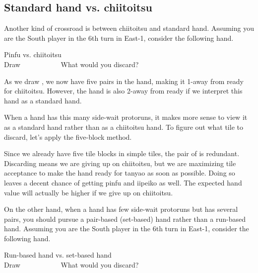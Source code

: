\newpage
\subsection{Standard hand vs. {\jap chiitoitsu}}
Another kind of crossroad is between {\jap chiitoitsu} and standard hand. Assuming you are the South player in the 6th turn in East-1, consider the following hand. 
\bigskip
\begin{itembox}[r]{{\jap Pinfu} vs. {\jap chiitoitsu}}
\bp
{}\bei\bei~\\
\hfill\footnotesize{Draw~~~~~~~~~~~}
\ep
\vspace{-17pt}What would you discard? \vspace{-5pt}
\end{itembox}

\bigskip
\noindent As we draw {\LARGE{}}, we now have five pairs in the hand, making it 1-away from ready for {\jap chiitoitsu}. However, the hand is also 2-away from ready if we interpret this hand as a standard hand. 

\bigskip
When a hand has this many side-wait protoruns, it makes more sense to view it as a standard hand rather than as a {\jap chiitoitsu} hand. To figure out what tile to discard, let's apply the five-block method. 

\emj
Since we already have five tile blocks in simple tiles, the pair of {\LARGE\bei} is redundant. Discarding {\LARGE\bei} means we are giving up on {\jap chiitoitsu}, but we are maximizing tile acceptance to make the hand ready for {\jap tanyao} as soon as possible. Doing so leaves a decent chance of getting {\jap pinfu} and {\jap iipeiko} as well. The expected hand value will actually be higher if we give up on {\jap chiitoitsu}.

\bigskip
On the other hand, when a hand has few side-wait protoruns but has several pairs, you should pursue a pair-based (set-based) hand rather than a run-based hand. Assuming you are the South player in the 6th turn in East-1, consider the following hand. 

\bigskip
\begin{itembox}[r]{Run-based hand vs. set-based hand}
\bp
{}\dong\nan\bai~\bai\\
\hfill\footnotesize{Draw~~~~~~~~~~~}
\ep
\vspace{-17pt}What would you discard? \vspace{-5pt}
\end{itembox}

